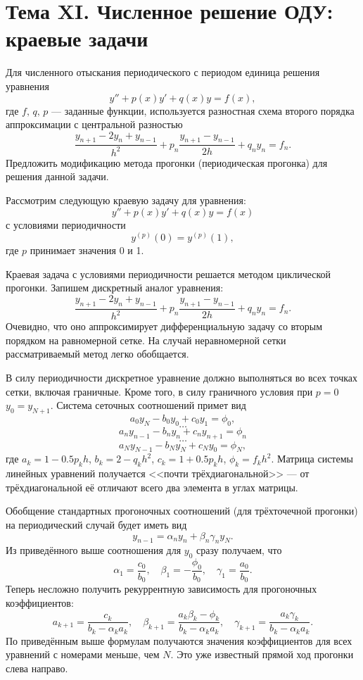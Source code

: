 \documentclass[a4paper]{article}
\begin{document}
\section*{Тема XI. Численное решение ОДУ: краевые
	задачи}	
\begin{hiProb}[7.2]
Для численного отыскания периодического с периодом
единица решения уравнения
\[
	y''+p(x)y'+q(x)y=f(x)
,\] 
где $f,\,q,\,p$ --- заданные функции, используется
разностная схема второго порядка аппроксимации с центральной
разностью
\[
\frac{y_{n+1}-2y_n+y_{n-1}}{h^2}+
p_n \frac{y_{n+1}-y_{n-1}}{2h}+q_n y_n=f_n
.\] 
Предложить модификацию метода прогонки
(периодическая прогонка) для решения данной задачи.
\end{hiProb}
\begin{sol}
Рассмотрим следующую краевую задачу для уравнения:
\[
	y''+p(x)y'+q(x) y=f(x)
\] 
с условиями периодичности
\[
	y ^{(p)}(0)=y^{(p)} (1)
,\]
где $p$ принимает значения 0 и 1.

Краевая задача с условиями периодичности решается
методом циклической прогонки. Запишем дискретный
аналог уравнения:
 \[
\frac{y_{n+1}-2y_n +y_{n-1}}{h^2}+p_n
\frac{y_{n+1}-y_{n-1}}{2h}+q_n y_n=f_n
.\] 
Очевидно, что оно аппроксимирует дифференциальную задачу
со вторым порядком на равномерной сетке. На случай
неравномерной сетки рассматриваемый метод легко
обобщается.

В силу периодичности дискретное уравнение должно
выполняться во всех точках сетки, включая граничные.
Кроме того, в силу граничного условия при $p=0$ 
$y_0=y_{N+1}$. Система сеточных соотношений примет вид
\[
a_0 y_N-b_0 y_0+c_0y_1=\phi_0,
\] 
\[
\ldots
\] 
\[
	a_n y_{n-1}-b_n y_n +c_n y_{n+1}=\phi_n
\] 
\[
\ldots
\] 
\[
a_{N}y_{N-1} -b_N y_N +c_N y_0= \phi_N
,\] 
где $a_k=1-0.5 p_k h$, $b_k=2-q_k h^2$, $c_k=1+0.5p_k h$,
$\phi_k =f_k h^2$. Матрица системы линейных
уравнений получается <<почти трёхдиагональной>> ---
от трёхдиагональной её отличают всего два элемента
в углах матрицы.

Обобщение стандартных прогоночных соотношений 
(для трёхточечной прогонки) на периодический случай
будет иметь вид
\[
y_{n-1}=\alpha_n y_n +\beta_n \gamma_n y_N
.\] 
Из приведённого выше соотношения для $y_0$ сразу
получаем, что
\[
\alpha_1 = \frac{c_0}{b_0},\quad
\beta_1= - \frac{\phi_0}{b_0},\quad
\gamma_1= \frac{a_0}{b_0}
.\] 
Теперь несложно получить рекуррентную зависимость
для прогоночных коэффициентов:
\[
a_{k+1}= \frac{c_k}{b_k-\alpha_k a_k},\quad
\beta_{k+1} = \frac{a_k \beta_k -\phi_k}{b_k-\alpha_k
a_k},\quad \gamma_{k+1}= \frac{a_k \gamma_k}{b_k -\alpha_k
a_k}
.\]
По приведённым выше формулам получаются значения
коэффициентов для всех уравнений с номерами меньше,
чем $N$. Это уже известный прямой ход прогонки слева
направо.


\end{sol}
\end{document}
